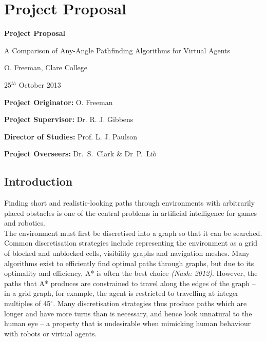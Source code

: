 \chapter{Project Proposal}

\vfil

\centerline{\Large \bf Project Proposal}
\vspace{0.4in}
\centerline{\Large A Comparison of Any-Angle Pathfinding Algorithms for Virtual Agents }
\vspace{0.4in}
\centerline{\large O. Freeman, Clare College}
\vspace{0.3in}
\centerline{\large 25$^{th}$ October 2013}
\vspace{0.3in}
\vfil

\noindent
{\bf Project Originator:} O. Freeman
\vspace{0.2in}

\noindent
{\bf Project Supervisor:} Dr. R. J. Gibbens
\vspace{0.2in}

\noindent
{\bf Director of Studies:} Prof. L. J. Paulson
\vspace{0.2in}
\noindent
 
\noindent
{\bf Project Overseers:} Dr.~S.~Clark \& Dr~P.~Li\`o



\section*{Introduction}


Finding short and realistic-looking paths through environments with arbitrarily placed obstacles is one of the central problems in artificial intelligence for games and robotics. \\

\noindent
The environment must first be discretised into a graph so that it can be searched. Common discretisation strategies include representing the environment as a grid of blocked and unblocked cells, visibility graphs and navigation meshes. Many algorithms exist to efficiently find optimal paths through graphs, but due to its optimality and efficiency, A* is often the best choice {\em (Nash: 2012)}. However, the paths that A* produces are constrained to travel along the edges of the graph -- in a grid graph, for example, the agent is restricted to travelling at integer multiples of 45$^\circ$. Many discretisation strategies thus produce paths which are longer and have more turns than is necessary, and hence look unnatural to the human eye -- a property that is undesirable when mimicking human behaviour with robots or virtual agents.\\


